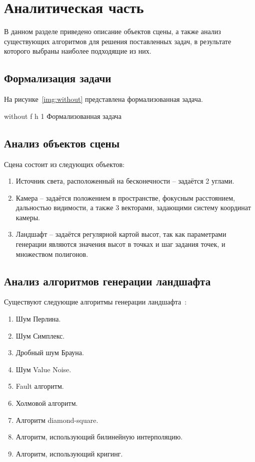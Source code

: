 \chapter{Аналитическая часть}

В данном разделе приведено описание объектов сцены, а также анализ существующих алгоритмов для решения поставленных задач, в результате которого выбраны наиболее подходящие из них.

\section{Формализация задачи}

На рисунке~\ref{img:without} представлена формализованная задача.

\FloatBarrier
{}
{without} %
{f} %
{h} %
{1\textwidth} %
{Формализованная задача} %
\FloatBarrier

\section{Анализ объектов сцены}

Сцена состоит из следующих объектов:

\begin{enumerate}[label=\arabic*.]
	\item Источник света, расположенный на бесконечности -- задаётся 2 углами.
	\item Камера -- задаётся положением в пространстве, фокусным расстоянием, дальностью видимости, а также 3 векторами, задающими систему координат камеры.
	\item Ландшафт -- задаётся регулярной картой высот, так как параметрами генерации являются значения высот в точках и шаг задания точек, и множеством полигонов.
\end{enumerate}

\section{Анализ алгоритмов генерации ландшафта}

Существуют следующие алгоритмы генерации ландшафта~\cite{landscapes}\cite{noises}\cite{nohabrinsource}\cite{usages}\cite{Voronezh}\cite{criging}:

\begin{enumerate}[label=\arabic*.]
	\item Шум Перлина.
	\item Шум Симплекс.
	\item Дробный шум Брауна.
	\item Шум Value Noise.
	\item Fault алгоритм.
	\item Холмовой алгоритм.
	\item Алгоритм diamond-square.
	\item Алгоритм, использующий билинейную интерполяцию.
	\item Алгоритм, использующий кригинг.
\end{enumerate}

